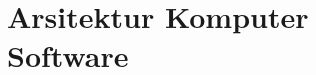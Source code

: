 \documentclass{WileySix}
\begin{document}












\part[Definisi dan Software]
{Arsitektur Komputer\\ Software}

%
\end{document}

